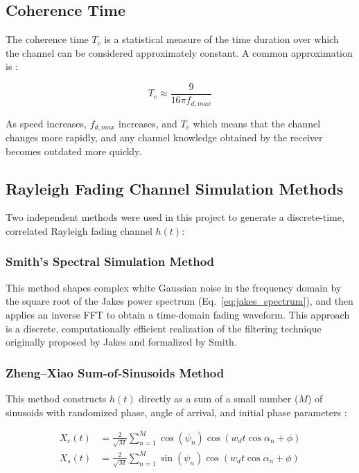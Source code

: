\documentclass[12pt]{article}
\begin{document}
\subsection{Coherence Time}

The coherence time $T_c$ is a statistical measure of the time
duration over which the channel can be considered approximately
constant. A common approximation is \cite{rappaport}:

\begin{equation}
    T_c \approx \frac{9}{16\pi f_{d,max}}
    \label{eq:coherence_time}
\end{equation}

As speed increases, $f_{d,max}$ increases, and $T_c$ which means that
the channel changes more rapidly, and any channel knowledge obtained by the receiver becomes 
outdated more quickly.

\subsection{Rayleigh Fading Channel Simulation Methods}

Two independent methods were used in this project to generate
a discrete-time, correlated Rayleigh fading channel $h(t)$:

\subsubsection{Smith's Spectral Simulation Method}

This method shapes complex white Gaussian noise in the
frequency domain by the square root of the Jakes power
spectrum (Eq.~\ref{eq:jakes_spectrum}), and then applies an
inverse FFT to obtain a time-domain fading waveform. This
approach is a discrete, computationally efficient realization of
the filtering technique originally proposed by Jakes
\cite{rappaport} and formalized by Smith.


\subsubsection{Zheng--Xiao Sum-of-Sinusoids Method}

This method constructs $h(t)$ directly as a sum of a small
number ($M$) of sinusoids with randomized phase, angle of
arrival, and initial phase parameters \cite{zhengxiao}:

\begin{align}
    X_c(t) &= \frac{2}{\sqrt{M}}\sum_{n=1}^{M}\cos(\psi_n)\cos(w_d t \cos\alpha_n + \phi) \\
    X_s(t) &= \frac{2}{\sqrt{M}}\sum_{n=1}^{M}\sin(\psi_n)\cos(w_d t \cos\alpha_n + \phi)
\end{align}
\end{document}
